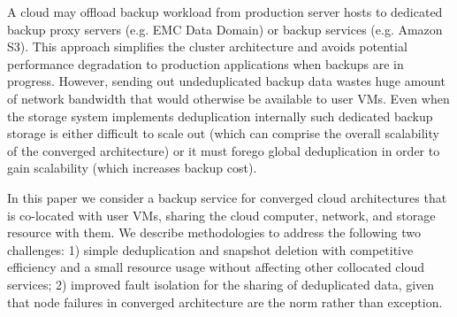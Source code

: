 A cloud may offload backup workload from production 
server hosts to dedicated backup proxy servers (e.g. EMC Data Domain) or
backup services (e.g. Amazon S3). This approach simplifies the cluster 
architecture and 
avoids potential performance degradation to production applications when 
backups are in progress.
However, sending out undeduplicated backup data wastes huge amount
of network bandwidth that would otherwise be available to user VMs. 
Even when the storage system implements deduplication internally
such dedicated backup storage is either difficult to scale out
(which can comprise the overall scalability of the converged architecture) 
or it must forego global deduplication in order to gain scalability 
(which increases backup cost).

In this paper we consider a backup service for converged cloud architectures
that is co-located with user VMs, sharing the cloud computer, network, and
storage resource with them.
We describe methodologies to address the following two challenges: 
1) simple deduplication and snapshot deletion with competitive efficiency and 
a small resource usage without affecting other collocated cloud services;
2) improved fault isolation for the sharing of deduplicated data,
given that node failures in converged architecture are the norm rather than
exception. 


 

